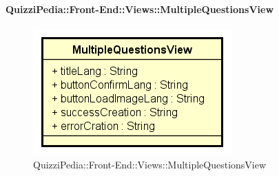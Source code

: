 \paragraph{QuizziPedia::Front-End::Views::MultipleQuestionsView}
\begin{figure} [ht]
	\centering
	\includegraphics[scale=0.80]{UML/Classi/Front-End/QuizziPedia_Front-end_Views_MultipleQuestionsView.png}
	\caption{QuizziPedia::Front-End::Views::MultipleQuestionsView}
\end{figure} \FloatBarrier
